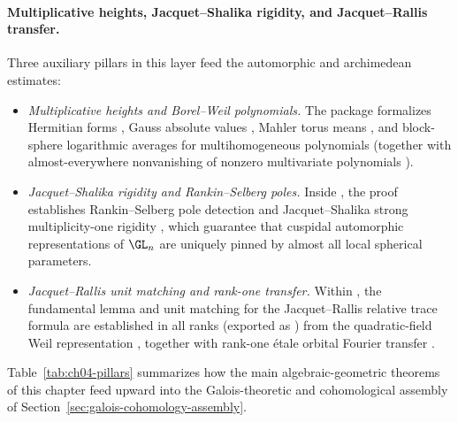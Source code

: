 \paragraph{Multiplicative heights, Jacquet--Shalika rigidity, and Jacquet--Rallis transfer.}
Three auxiliary pillars in this layer feed the automorphic and archimedean
estimates:
\begin{itemize}
  \item \emph{Multiplicative heights and Borel--Weil polynomials.} The package
   formalizes Hermitian forms
  , Gauss absolute
  values , Mahler
  torus means ,
  and block-sphere logarithmic averages
   for
  multihomogeneous polynomials
  (together with almost-everywhere nonvanishing of nonzero multivariate
  polynomials
  ).
  \item \emph{Jacquet--Shalika rigidity and Rankin--Selberg poles.} Inside
  , the proof establishes Rankin--Selberg pole
  detection  and
  Jacquet--Shalika strong multiplicity-one rigidity
  , which
  guarantee that cuspidal automorphic representations of $\GL_n$ are uniquely
  pinned by almost all local spherical parameters.
  \item \emph{Jacquet--Rallis unit matching and rank-one transfer.} Within
  , the
  fundamental lemma and unit matching for the Jacquet--Rallis relative trace
  formula are established in all ranks 
  (exported as )
  from the quadratic-field Weil representation
  ,
  together with rank-one étale orbital Fourier transfer
  .
\end{itemize}

Table~\ref{tab:ch04-pillars} summarizes how the main algebraic-geometric
theorems of this chapter feed upward into the Galois-theoretic and
cohomological assembly of Section~\ref{sec:galois-cohomology-assembly}.

